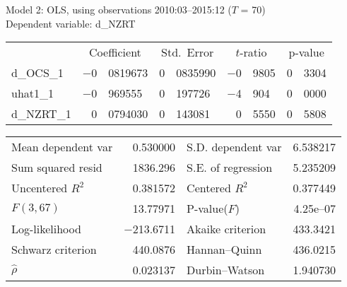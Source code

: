 \documentclass[11pt]{article}
\begin{document}
\thispagestyle{empty}

\begin{center}

Model 2: OLS, using observations 2010:03--2015:12 ($T$ = 70)\\
Dependent variable: d\_NZRT\\

\vspace{1em}

\begin{tabular}{lr@{.}lr@{.}lr@{.}lr@{.}l}
  &
 \multicolumn{2}{c}{Coefficient} &
  \multicolumn{2}{c}{Std.\ Error} &
   \multicolumn{2}{c}{$t$-ratio} &
    \multicolumn{2}{c}{p-value} \\[1ex]
d\_OCS\_1 &
  $-$0&0819673 &
    0&0835990 &
      $-$0&9805 &
        0&3304 \\
uhat1\_1 &
  $-$0&969555 &
    0&197726 &
      $-$4&904 &
        0&0000 \\
d\_NZRT\_1 &
  0&0794030 &
    0&143081 &
      0&5550 &
        0&5808 \\
\end{tabular}

\vspace{1ex}
\begin{tabular}{lrlr}
Mean dependent var &  0.530000 & S.D. dependent var &  6.538217 \\
Sum squared resid &  1836.296 & S.E. of regression &  5.235209 \\
Uncentered $R^2$ &  0.381572 & Centered $R^2$ &  0.377449 \\
$F(3, 67)$ &  13.77971 & P-value($F$) &  4.25\textrm{e--07} \\
Log-likelihood & $-$213.6711 & Akaike criterion &  433.3421 \\
Schwarz criterion &  440.0876 & Hannan--Quinn &  436.0215 \\
$\hat{\rho}$ &  0.023137 & Durbin--Watson &  1.940730 \\
\end{tabular}


\end{center}
\end{document}
